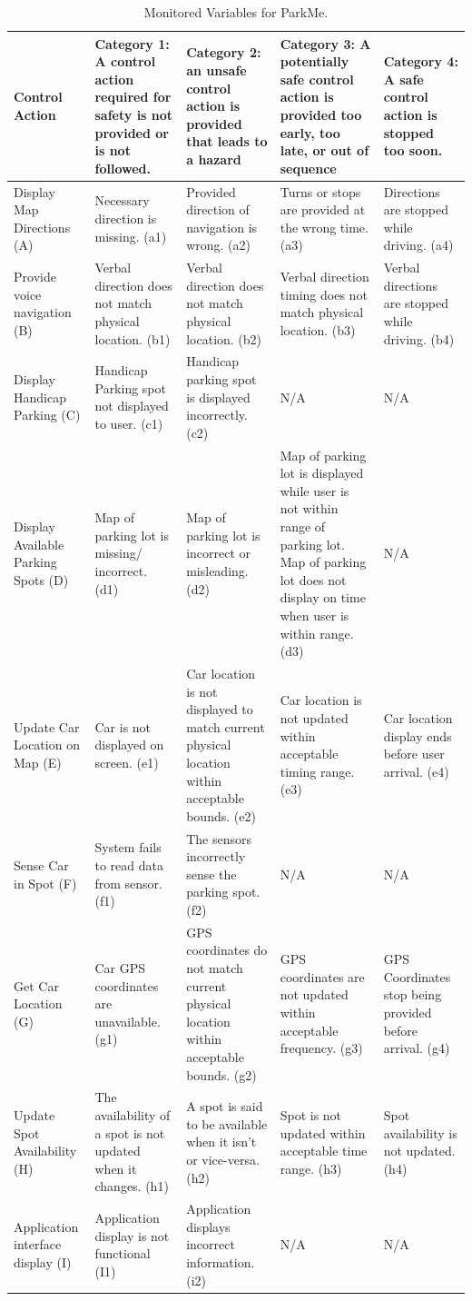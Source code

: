 \documentclass[]{article}
\begin{document}
\begin{table}
	\begin{tabular}{ | m{2.5cm} | m{3cm}| m{3cm}| m{3cm}| m{3cm} |} 
		\hline
		Control Action & 
		Category 1: A control action required for safety is not provided or is not followed.
		 & 
		 Category 2: an unsafe control action is provided that leads to a hazard
		  & 
		  Category 3: A potentially safe control action is provided too early, too late, or out of sequence
		   & 
		   Category 4: A safe control action is stopped too soon.
		    \\ [0.5ex] 
		\hline
		Display Map Directions (A) & Necessary direction is missing. (a1) & Provided direction of navigation is wrong. (a2) & Turns or stops are provided at the wrong time. (a3) & Directions are stopped while driving. (a4) \\ 
		\hline
		Provide voice navigation (B) & Verbal direction does not match physical location. (b1) & Verbal direction does not match physical location. (b2)
	 & Verbal direction timing does not match physical location. (b3) & Verbal directions are stopped while driving. (b4) \\ 
		\hline 
		Display Handicap Parking (C) & Handicap Parking spot not displayed to user. (c1) & Handicap parking spot is displayed incorrectly. (c2) & N/A & N/A \\
		\hline
		Display Available Parking Spots (D) & Map of parking lot is missing/ incorrect. (d1) & Map of parking lot is incorrect or misleading. (d2) & Map of parking lot is displayed while user is not within range of parking lot. Map of parking lot does not display on time when user is within range. (d3) & N/A \\	
		\hline
		Update Car Location on Map (E) & Car is not displayed on screen. (e1) & Car location is not displayed to match current physical location within acceptable bounds. (e2) & Car location is not updated within acceptable timing range. (e3) & Car location display ends before user arrival. (e4) \\	
		\hline
		Sense Car in Spot (F) & System fails to read data from sensor. (f1) & The sensors incorrectly sense the parking spot. (f2) & N/A & N/A \\	
		\hline
		Get Car Location (G) & Car GPS coordinates are unavailable. (g1) & GPS coordinates do not match current physical location within acceptable bounds. (g2) & GPS coordinates are not updated within acceptable frequency. (g3) & GPS Coordinates stop being provided before arrival. (g4) \\	
		\hline
		Update Spot Availability (H) & The availability of a spot is not updated when it changes. (h1) & A spot is said to be available when it isn’t or vice-versa. (h2) & Spot is not updated within acceptable time range. (h3) & Spot availability is not updated. (h4) \\	
		\hline
		Application interface display (I) & Application display is not functional (I1) & Application displays incorrect information. (i2) & N/A & N/A \\	
		\hline
	\end{tabular}
	\caption{Monitored Variables for ParkMe.}
\end{table}
\end{document}
